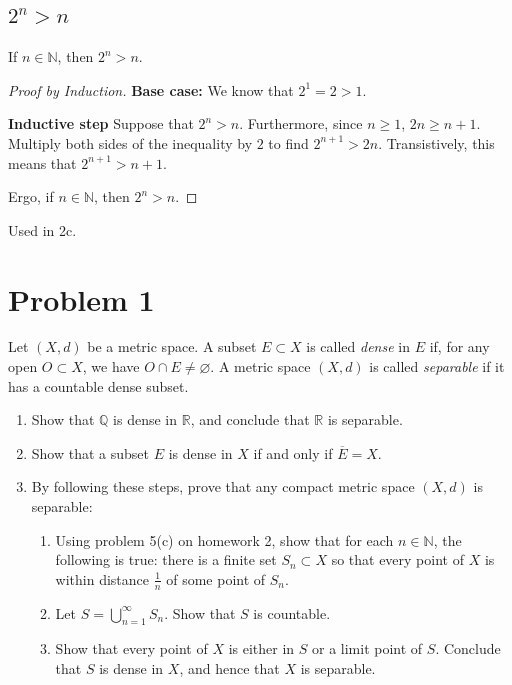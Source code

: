 \documentclass[11pt]{article}
\begin{document}
    \subsection{$2^n > n$}
        If $n \in \mathbb{N}$, then $2^n > n$.
        \begin{proof}[Proof by Induction]
            \textbf{Base case:}
                We know that $2^1 = 2 > 1$.

            \textbf{Inductive step}
                Suppose that $2^n > n$.
                Furthermore, since $n \geq 1$, $2n \geq n + 1$.
                Multiply both sides of the inequality by $2$ to find $2^{n+1} > 2n$.
                Transistively, this means that $2^{n+1} > n + 1$.

            Ergo, if $n \in \mathbb{N}$, then $2^n > n$.
        \end{proof}
        Used in 2c.

\pagebreak
\section{Problem 1}
    Let $(X, d)$ be a metric space. A subset $E \subset X$ is called \textit{dense} in $E$ if, for any open $O \subset X$, we have $O \cap E \neq \varnothing$. A metric space $(X, d)$ is called \textit{separable} if it has a countable dense subset.
    \begin{enumerate}[label=(\alph*)]
        \item 
        Show that $\mathbb{Q}$ is dense in $\mathbb{R}$, and conclude that $\mathbb{R}$ is separable.

        \item
        Show that a subset $E$ is dense in $X$ if and only if $\overline{E} = X$.

        \item 
        By following these steps, prove that any compact metric space $(X, d)$ is separable:
        \begin{enumerate}[label=(\roman*)]
            \item 
            Using problem 5(c) on homework 2, show that for each $n \in \mathbb{N}$, the following is true: there is a finite set $S_n \subset X$ so that every point of $X$ is within distance $\frac{1}{n}$ of some point of $S_n$.

            \item 
            Let $S = \bigcup\limits_{n = 1}^{\infty} S_n$. Show that $S$ is countable.

            \item 
            Show that every point of $X$ is either in $S$ or a limit point of $S$. Conclude that $S$ is dense in $X$, and hence that $X$ is separable.
            
        \end{enumerate}
        
    \end{enumerate}
\end{document}
